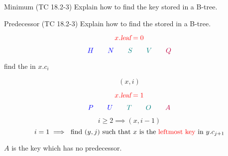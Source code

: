
\begin{frame}{}
  \begin{exampleblock}{Minimum (TC 18.2-3)}
    Explain how to find the  key stored in a B-tree. 
  \end{exampleblock}


  \pause
  \vspace{0.30cm}
  \begin{center}
  \end{center}
\end{frame}

\begin{frame}{}
  \begin{exampleblock}{Predecessor (TC 18.2-3)}
    Explain how to find the  stored in a B-tree.
  \end{exampleblock}

  \pause
  \begin{center}
  \end{center}

  \pause
  \[
    \textcolor{red}{x.\textsl{leaf} = 0}
  \]

  \pause
  \vspace{-0.30cm}
  \[
    \textcolor{blue}{H \qquad N} \qquad \textcolor{teal}{S \qquad V} \qquad \textcolor{purple}{Q}
  \]

  \pause
  \vspace{0.20cm}
  \begin{center}
    find the  in $x.c_{i}$
  \end{center}
\end{frame}

\begin{frame}{}
  \[
    (x, i)
  \]

  \[
    \textcolor{red}{x.\textsl{leaf} = 1}
  \]

  \vspace{-0.30cm}
  \[
    \textcolor{blue}{P \qquad U \qquad} \textcolor{teal}{T\qquad O \qquad} \textcolor{purple}{A}
  \]

  \pause
  \[
    i \ge 2 \implies (x, i-1)
  \]
  \[
    i = 1 \implies \text{ find $(y, j)$ such that $x$ is the \textcolor{red}{leftmost key} in $y.c_{j + 1}$}
  \]

  \pause
  \begin{center}
    $A$ is the  key which has no predecessor.
  \end{center}
\end{frame}

\begin{frame}{}
  
\end{frame}
